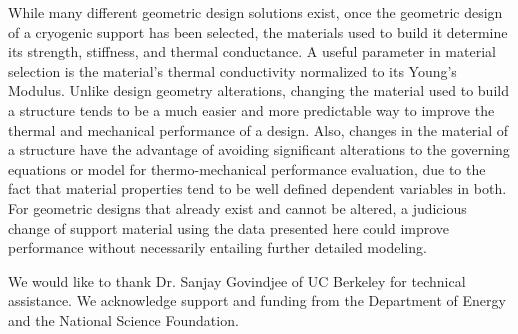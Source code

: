 \documentclass[final]{svjour2}
\begin{document}
While many different geometric design solutions exist, once the geometric design of a cryogenic support has been selected, the materials used to build it determine its strength, stiffness, and thermal conductance. A useful parameter in material selection is the material's thermal conductivity normalized to its Young's Modulus.  Unlike design geometry alterations, changing the material used to build a structure tends to be a much easier and more predictable way to improve the thermal and mechanical performance of a design. Also, changes in the material of a structure have the advantage of avoiding significant alterations to the governing equations or model for thermo-mechanical performance evaluation, due to the fact that material properties tend to be well defined dependent variables in both. For geometric designs that already exist and cannot be altered, a judicious change of support material using the data presented here could improve performance without necessarily entailing further detailed modeling.

\begin{acknowledgements}
We would like to thank Dr. Sanjay Govindjee of UC Berkeley for technical assistance. We acknowledge support and funding from the Department of Energy and the National Science Foundation.
\end{acknowledgements}
\end{document}
